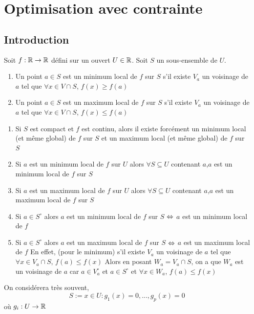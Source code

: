 \chapter{Optimisation avec contrainte}

\section{Introduction}

Soit $f : \mathbb{R} \to \mathbb{R} $ défini sur un ouvert $U \in \mathbb{R}$.
Soit $S$ un sous-ensemble de $U$.
\begin{definition}
    \begin{enumerate}
        \item Un point $a \in S$ est un minimum local de $f$ sur $S$
        s'il existe $V_a$ un voisinage de $a$ tel que $\forall x \in V\cap S$,
        $f(x) \ge f(a)$
        \item Un point $a \in S$ est un maximum local de $f$ sur $S$
        s'il existe $V_a$ un voisinage de $a$ tel que $\forall x \in V\cap S$,
        $f(x) \le f(a)$
    \end{enumerate}
\end{definition}

\begin{remarque}
\begin{enumerate}
    \item Si $S$ est compact et $f$ est continu,
    alors il existe forcément un minimum local (et même global) de $f$ sur $S$ et un 
    maximum local (et même global) de $f$ sur $S$
    \item Si $a$ est un minimum local de $f$ sur $U$ alors $\forall S \subseteq U$ contenant $a$,$a$ 
    est un minimum local de $f$ sur $S$
    \item Si $a$ est un maximum local de $f$ sur $U$ alors $\forall S \subseteq U$ contenant $a$,$a$ 
    est un maximum local de $f$ sur $S$
    \item Si $a \in S^\circ$ alors 
    $a$ est un minimum local de $f$ sur $S$ $\Leftrightarrow$ $a$ est un minimum  local de $f$
    \item Si $a \in S^\circ$ alors 
    $a$ est un maximum local de $f$ sur $S$ $\Leftrightarrow$ $a$ est un maximum  local de $f$
    En effet, (pour le minimum) s'il existe $V_a$ un voisinage de $a$ tel que $\forall x \in V_a\cap S$,
    $f(a) \le f(x)$
    Alors en posant $W_a = V_a \cap S$, on a que $W_a$ est un voisinage de $a$ car 
    $a\in V_a^\circ$ et $a\in S^\circ$ et $\forall x \in W_a$, $f(a) \le f(x)$
\end{enumerate}
\end{remarque}
On considérera très souvent,
$$S := {x\in U : g_1(x) = 0,..., g_p(x) = 0}$$ où $g_i : U \to \mathbb{R}$

